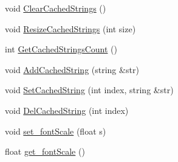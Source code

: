 \begin{DoxyCompactItemize}
\item 
void \hyperlink{class_g_u_i_label_a2a549c26e59a5b6f9177181325ad2518}{Clear\+Cached\+Strings} ()
\item 
void \hyperlink{class_g_u_i_label_a0ce7c11de53589c0e184861fe9b1a2cf}{Resize\+Cached\+Strings} (int size)
\item 
int \hyperlink{class_g_u_i_label_a67a8d240c2c8c2434f40e12e12390c0d}{Get\+Cached\+Strings\+Count} ()
\item 
void \hyperlink{class_g_u_i_label_a77943877d13b2feadb46022ad7ef4d74}{Add\+Cached\+String} (string \&str)
\item 
void \hyperlink{class_g_u_i_label_a7bea55c4ba7501ef53fcbb31c0e5bab7}{Set\+Cached\+String} (int index, string \&str)
\item 
void \hyperlink{class_g_u_i_label_aeb3ec4ecdc0c2354a0712232181b7758}{Del\+Cached\+String} (int index)
\item 
void \hyperlink{class_g_u_i_label_a40ac30107b25bcc4976b3e4ee6e1bd34}{set\+\_\+font\+Scale} (float s)
\item 
float \hyperlink{class_g_u_i_label_a3e9671282b142d0421f7887ea2c4924c}{get\+\_\+font\+Scale} ()
\end{DoxyCompactItemize}
